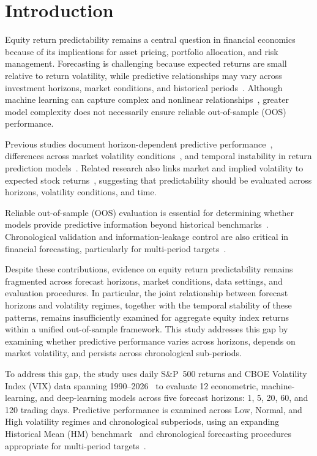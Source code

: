 \documentclass[runningheads,orivec]{llncs}
\begin{document}
\section{Introduction}\label{sec:intro}

Equity return predictability remains a central question in financial economics because of its implications for asset pricing, portfolio allocation, and risk management. Forecasting is challenging because expected returns are small relative to return volatility, while predictive relationships may vary across investment horizons, market conditions, and historical periods~\cite{campbell1998,welch2008}. Although machine learning can capture complex and nonlinear relationships~\cite{gu2020}, greater model complexity does not necessarily ensure reliable out-of-sample (OOS) performance.

Previous studies document horizon-dependent predictive performance~\cite{nechvatalova2024,xu2020}, differences across market volatility conditions~\cite{baltas2018,cakici2025}, and temporal instability in return prediction models~\cite{harvey2021,paye2006}. Related research also links market and implied volatility to expected stock returns~\cite{banerjee2007,bekaert2014,french1987}, suggesting that predictability should be evaluated across horizons, volatility conditions, and time.

Reliable out-of-sample (OOS) evaluation is essential for determining whether models provide predictive information beyond historical benchmarks~\cite{campbell2008,welch2008}. Chronological validation and information-leakage control are also critical in financial forecasting, particularly for multi-period targets~\cite{hewamalage2023,perez2026,tashman2000}.

Despite these contributions, evidence on equity return predictability remains fragmented across forecast horizons, market conditions, data settings, and evaluation procedures. In particular, the joint relationship between forecast horizons and volatility regimes, together with the temporal stability of these patterns, remains insufficiently examined for aggregate equity index returns within a unified out-of-sample framework. This study addresses this gap by examining whether predictive performance varies across horizons, depends on market volatility, and persists across chronological sub-periods.

To address this gap, the study uses daily S\&P~500 returns and CBOE Volatility Index (VIX) data spanning 1990--2026~\cite{fredvix,yahoosandp} to evaluate 12 econometric, machine-learning, and deep-learning models across five forecast horizons: 1, 5, 20, 60, and 120 trading days. Predictive performance is examined across Low, Normal, and High volatility regimes and chronological subperiods, using an expanding Historical Mean (HM) benchmark~\cite{campbell2008} and chronological forecasting procedures appropriate for multi-period targets~\cite{hewamalage2023,tashman2000}.
\end{document}
